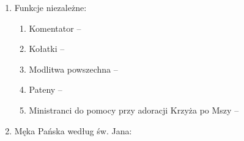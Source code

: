 \documentclass[10pt,oneside,final,notitlepage,a4paper,wide]{mwart}
\begin{document}
\begin{enumerate}
\smallskip
	\item Funkcje niezależne:
	\begin{enumerate}
		\item Komentator --
		\item Kołatki -- 
		\item Modlitwa powszechna -- 
		\item Pateny --
		\item Ministranci do pomocy przy adoracji Krzyża po Mszy --
	\end{enumerate}
\medskip
	\item Męka Pańska według św. Jana:
\end{enumerate}
\end{document}
